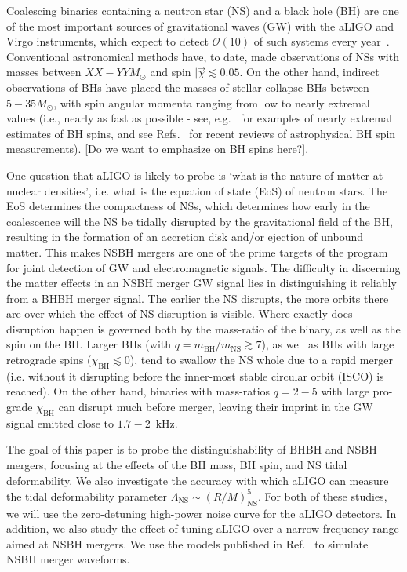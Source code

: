 \documentclass[aps,prd,amsmath,floats,floatfix, twocolumn,
superscriptaddress,nofootinbib,showpacs]{revtex4-1}
\newcommand{\prayush}{\textcolor{red!40!black}}
\newcommand{\NS}{\mathrm{NS}}
\begin{document}
Coalescing binaries containing a neutron star (NS) and a black hole (BH) are
one of the most important sources of gravitational waves (GW) with the aLIGO
and Virgo instruments, which expect to detect $\mathcal{O}(10)$
of such systems every 
year~\cite{Abadie:2010cf}. Conventional astronomical methods have, to date, made 
observations of NSs with masses between $XX-YY M_\odot$ and spin
$|\vec{\chi}\lesssim 0.05$. On the other hand, indirect observations of BHs 
have placed the masses of stellar-collapse BHs between $5-35M_\odot$, with 
spin angular momenta ranging from low to nearly extremal values (i.e., nearly
as fast as possible - see,
e.g.~\cite{McClintockEtAl:2006,Miller:2009cw,Gou:2014una} for examples of 
nearly extremal estimates of BH spins, and see
Refs.~\cite{McClintock:2013vwa,Reynolds:2013qqa} for recent reviews of
astrophysical BH spin measurements). \prayush{[Do we want to emphasize on BH
spins here?]}. 


One question that aLIGO is likely to probe is `what is the nature of
matter at nuclear densities', i.e. what is the equation of state (EoS) of 
neutron stars. The EoS determines the compactness of NSs, which
determines how early in the coalescence will the NS be tidally disrupted
by the gravitational field of the BH, resulting in the formation
of an accretion disk and/or ejection of unbound matter. This makes NSBH
mergers are one of the prime targets of the program for joint detection of
GW and electromagnetic signals. 
% 
The difficulty in discerning the matter effects in an NSBH merger GW signal
lies in distinguishing it reliably from a BHBH merger signal. The earlier the
NS disrupts, the more orbits there are over which the effect of NS disruption
is visible. Where exactly does disruption happen is governed both by the 
mass-ratio of the binary, as well as the spin on the BH. Larger BHs (with
$q=m_\mathrm{BH}/m_\mathrm{NS}\gtrsim 7$), as well as BHs with large retrograde
spins ($\chi_\mathrm{BH} \lesssim 0$), tend to swallow the NS whole due to a
rapid merger (i.e. without it disrupting before the inner-most stable circular
orbit (ISCO) is reached). On the other hand, binaries with mass-ratios 
$q=2-5$ with large pro-grade $\chi_\mathrm{BH}$ can disrupt much before 
merger, leaving their imprint in the GW signal emitted close to $1.7-2$~kHz.
% 

The goal of this paper is to probe the distinguishability of BHBH and NSBH
mergers, focusing at the effects of the BH mass, BH spin, and NS tidal 
deformability. We also investigate the accuracy with which aLIGO can measure
the tidal deformability parameter $\Lambda_\NS\sim(R/M)^5_\NS$. For both of 
these studies, we will use the zero-detuning high-power noise curve for the
aLIGO detectors. \prayush{In addition, we also study the effect of tuning aLIGO
over a narrow frequency range aimed at NSBH mergers.}
We use the models published in Ref.~\cite{Lackey:2013axa,Pannarale:2015jka} to
simulate NSBH merger waveforms.
\end{document}
